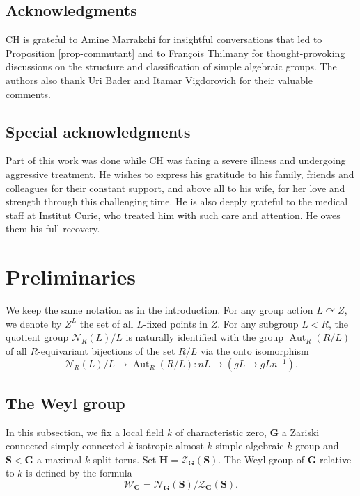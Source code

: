 \documentclass[11pt]{amsart}
\numberwithin{equation}{section}
\theoremstyle{plain}
\theoremstyle{definition}
\newcommand{\Aut}{\operatorname{Aut}}
\begin{document}
\subsection*{Acknowledgments} CH is grateful to Amine Marrakchi for insightful conversations that led to Proposition \ref{prop-commutant} and to Fran\c{c}ois Thilmany for thought-provoking discussions on the structure and classification of simple algebraic groups. The authors also thank Uri Bader and Itamar Vigdorovich for their valuable comments.

\subsection*{Special acknowledgments} Part of this work was done while CH was facing a severe illness and undergoing aggressive treatment. He wishes to express his gratitude to his family, friends and colleagues for their constant support, and above all to his wife, for her love and strength through this challenging time. He is also deeply grateful to the medical staff at Institut Curie, who treated him with such care and attention. He owes them his full recovery.

\section{Preliminaries}

We keep the same notation as in the introduction. For any group action $L \curvearrowright Z$, we denote by $Z^L$ the set of all $L$-fixed points in $Z$. For any subgroup $L < R$, the quotient group $\mathscr N_{R}(L)/L$ is naturally identified with the group $\Aut_R(R/L)$ of all $R$-equivariant bijections of the set $R/L$ via the onto isomorphism
$$\mathscr N_{R}(L)/L \to \Aut_R(R/L) : n L \mapsto \left( gL \mapsto g Ln^{-1} \right).$$


\subsection{The Weyl group}


In this subsection, we fix a local field $k$ of characteristic zero, $\mathbf G$ a Zariski connected simply connected $k$-isotropic almost $k$-simple algebraic $k$-group and $\mathbf S < \mathbf G$ a maximal $k$-split torus. Set $\mathbf H = \mathscr Z_{\mathbf G}(\mathbf S)$. The Weyl group of $\mathbf G$ relative to $k$ is defined by the formula
$$\mathscr W_{\mathbf G} = \mathscr N_{\mathbf G}(\mathbf S)/\mathscr Z_{\mathbf G}(\mathbf S).$$ 
\end{document}
